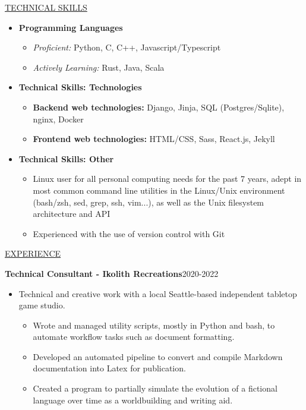 \documentclass[11pt]{article}
\newcommand{\betteruline}[1]{
    \uline{#1}
}
\newcommand{\sectiontitle}[1]{
    \begingroup
        \titlebold
        \betteruline{\Large\uppercase{#1}  }
        \vspace{1.7mm}
    \endgroup
}
\newcommand{\sectioncontent}[1]{
    \begingroup
        \begin{FlushLeft}
        \vspace{-3mm}
        \sffamily\small#1
        \end{FlushLeft}
    \endgroup
    \vspace{2mm}
}
\begin{document}
\begin{paracol}{2}
{\begin{itemize}
      \end{itemize}
    }

    \switchcolumn
    

    \sectiontitle{Technical Skills}
    \sectioncontent{
      \begin{itemize}
        \item \textbf{Programming Languages}
          \begin{itemize}
            \item \textit{Proficient:} Python, C, C++, Javascript/Typescript
            \item \textit{Actively Learning:} Rust, Java, Scala
          \end{itemize}

        \item \textbf{Technical Skills: Technologies}
            \begin{itemize}
                \item \textbf{Backend web technologies:} Django, Jinja, SQL (Postgres/Sqlite), nginx, Docker
                \item \textbf{Frontend web technologies:} HTML/CSS, Sass, React.js, Jekyll 
            \end{itemize}

        \item \textbf{Technical Skills: Other}
          \begin{itemize}
            \item  Linux user for all personal computing needs for the past 7 years, adept in most common command line utilities in the Linux/Unix environment (bash/zsh, sed, grep, ssh, vim...), as well as the Unix filesystem architecture and API
            \item Experienced with the use of version control with Git
          \end{itemize}
      \end{itemize}
    }

        \sectiontitle{Experience} 
        \sectioncontent{
        \begingroup
      \textbf{Technical Consultant - Ikolith Recreations}\hfill\color{black!70}\small{2020-2022}
        \endgroup
      \begin{itemize}
          \item Technical and creative work with a local Seattle-based independent tabletop game studio. 
              \begin{itemize}
                  \item Wrote and managed utility scripts, mostly in Python and bash, to automate workflow tasks such as document formatting.
                    \item Developed an automated pipeline to convert and compile Markdown documentation into Latex for publication.
                    \item Created a program to partially simulate the evolution of a fictional language over time as a worldbuilding and writing aid.
              \end{itemize}
        \end{itemize}
        }



\end{paracol}
\end{document}
